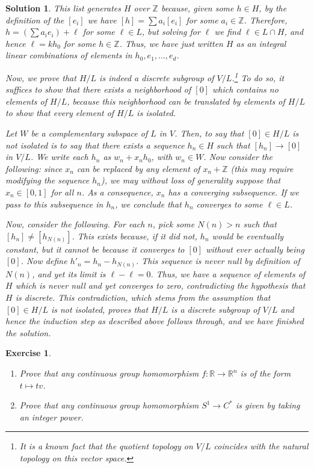 \documentclass{article}
\newtheorem{ex}{Exercise}
\theoremstyle{nonumberplain}
\newtheorem{sol}{Solution}
\newcommand{\R}{\mathbb{R}}
\newcommand{\Z}{\mathbb{Z}}
\begin{document}
\begin{sol}
This list generates $H$ over $\Z$ because, given some $h \in H$, by the definition of the $[e_i]$ we have $[h] = \sum a_i [e_i]$ for some $a_i \in \Z$. Therefore, $h = \left( \sum a_i e_i \right) + \ell$ for some $\ell \in L$, but solving for $\ell$ we find $\ell \in L \cap H$, and hence $\ell = k h_0$ for some $h \in \Z$. Thus, we have just written $H$ as an integral linear combinations of elements in $h_0, e_1, \dots, e_d$.

Now, we prove that $H/L$ is indeed a discrete subgroup of $V/L$.\footnote{It is a known fact that the quotient topology on $V/L$ coincides with the natural topology on this vector space.} To do so, it suffices to show that there exists a neighborhood of $[0]$ which contains no elements of $H/L$, because this neighborhood can be translated by elements of $H/L$ to show that every element of $H/L$ is isolated.

Let $W$ be a complementary subspace of $L$ in $V$. Then, to say that $[0] \in H/L$ is not isolated is to say that there exists a sequence $h_n \in H$ such that $[h_n] \to [0]$ in $V/L$. We write each $h_n$ as $w_n + x_n h_0$, with $w_n \in W$. Now consider the following: since $x_n$ can be replaced by any element of $x_n + \Z$ (this may require modifying the sequence $h_n$), we may without loss of generality suppose that $x_n \in [0,1]$ for all $n$. As a consequence, $x_n$ has a converging subsequence. If we pass to this subsequence in $h_n$, we conclude that $h_n$ converges to some $\ell \in L$.

Now, consider the following. For each $n$, pick some $N(n) > n$ such that $[h_n] \neq [h_{N(n)}]$. This exists because, if it did not, $h_n$ would be eventually constant, but it cannot be because it converges to $[0]$ without ever actually being $[0]$. Now define $h'_n = h_n - h_{N(n)}$. This sequence is never null by definition of $N(n)$, and yet its limit is $\ell - \ell = 0$. Thus, we have a sequence of elements of $H$ which is never null and yet converges to zero, contradicting the hypothesis that $H$ is discrete. This contradiction, which stems from the assumption that $[0] \in H/L$ is not isolated, proves that $H/L$ is a discrete subgroup of $V/L$ and hence the induction step as described above follows through, and we have finished the solution.
\end{sol}

\begin{ex}\leavevmode
\begin{enumerate}
\item Prove that any continuous group homomorphism $f \colon \R \to \R^n$ is of the form $t \mapsto tv$.
\item Prove that any continuous group homomorphism $S^1 \to C^*$ is given by taking an integer power.
\end{enumerate}
\end{ex}
\end{document}

